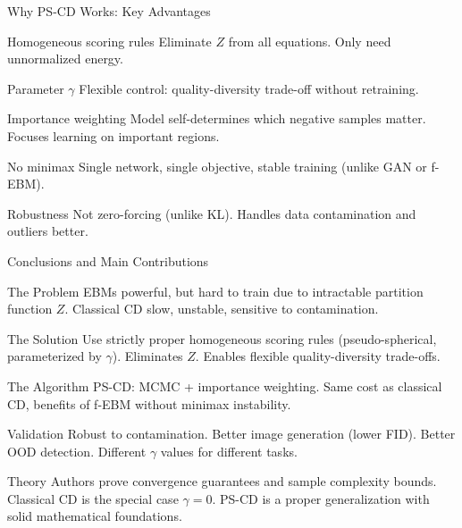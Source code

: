 \documentclass{beamer}
\begin{document}
\begin{frame}{Why PS-CD Works: Key Advantages}
\small
\begin{block}{Homogeneous scoring rules}
Eliminate $Z$ from all equations. Only need unnormalized energy.
\end{block}

\begin{block}{Parameter $\gamma$}
Flexible control: quality-diversity trade-off without retraining.
\end{block}

\begin{block}{Importance weighting}
Model self-determines which negative samples matter. Focuses learning on important regions.
\end{block}

\begin{block}{No minimax}
Single network, single objective, stable training (unlike GAN or f-EBM).
\end{block}

\begin{block}{Robustness}
Not zero-forcing (unlike KL). Handles data contamination and outliers better.
\end{block}
\end{frame}


\begin{frame}{Conclusions and Main Contributions}
\small
\begin{block}{The Problem}
EBMs powerful, but hard to train due to intractable partition function $Z$.
Classical CD slow, unstable, sensitive to contamination.
\end{block}

\begin{block}{The Solution}
Use strictly proper homogeneous scoring rules (pseudo-spherical, parameterized by $\gamma$).
Eliminates $Z$. Enables flexible quality-diversity trade-offs.
\end{block}

\begin{block}{The Algorithm}
PS-CD: MCMC + importance weighting. Same cost as classical CD, benefits of f-EBM without minimax instability.
\end{block}

\begin{block}{Validation}
Robust to contamination. Better image generation (lower FID). Better OOD detection.
Different $\gamma$ values for different tasks.
\end{block}

\begin{block}{Theory}
Authors prove convergence guarantees and sample complexity bounds. Classical CD is the special case $\gamma=0$. 
PS-CD is a proper generalization with solid mathematical foundations.
\end{block}
\end{frame}
\end{document}
